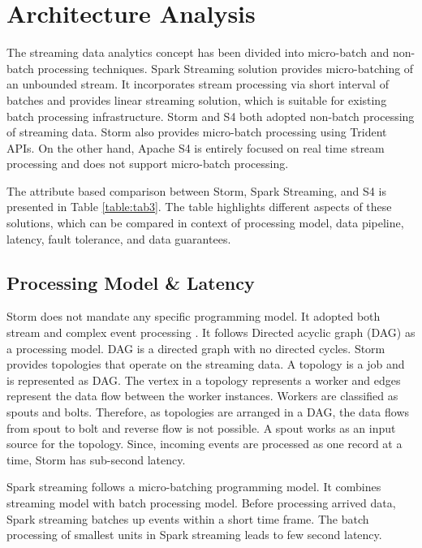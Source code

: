 \documentclass{acm_proc_article-sp}
\begin{document}
\section{Architecture Analysis} 

The streaming data analytics concept has been divided into micro-batch and non-batch processing techniques. Spark Streaming solution provides micro-batching of an unbounded stream. It incorporates stream processing via short interval of batches and provides linear streaming solution, which is suitable for existing batch processing infrastructure. Storm and S4 both adopted non-batch processing of streaming data. Storm also provides micro-batch processing using Trident APIs. On the other hand,  Apache S4  is entirely focused on real time stream processing and does not support micro-batch processing. 



The attribute based comparison between Storm, Spark Streaming, and S4 is presented in Table \ref{table:tab3}.  The table highlights different aspects of these solutions, which can be compared in context of processing model, data pipeline, latency,  fault tolerance, and data guarantees. 


\subsection{Processing Model \& Latency}

Storm does not mandate any specific programming model. It adopted both stream and complex event processing \cite{stromjens}. It follows Directed acyclic graph (DAG) as a processing model. DAG is a directed graph with no directed cycles. Storm provides topologies that operate on the streaming data. A topology is a job and is represented as DAG. The vertex in a topology represents a worker and edges represent the data flow between the worker instances. Workers are classified as spouts and bolts. Therefore, as topologies are arranged in a  DAG, the data flows from spout to bolt and reverse flow is not possible. A spout works as an input source for the topology. Since, incoming events are processed as one record at a time, Storm has sub-second latency.    

Spark streaming follows a micro-batching programming model. It combines streaming model with batch processing model. Before processing arrived data, Spark streaming batches up events within a short time frame. The batch processing of smallest units in Spark streaming leads to few second latency.  
\end{document}

